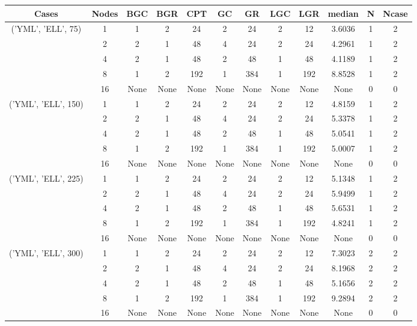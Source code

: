 \begin{tabular}{cccccccccccc}
\hline
Cases & Nodes& BGC& BGR& CPT& GC& GR& LGC& LGR& median & N & Ncase \\
\hline
\multirow{5}{*}{('YML', 'ELL', 75)}& 1& 1& 2& 24& 2& 24& 2& 12& 3.6036& 1& 2\\
& 2& 2& 1& 48& 4& 24& 2& 24& 4.2961& 1& 2\\
& 4& 2& 1& 48& 2& 48& 1& 48& 4.1189& 1& 2\\
& 8& 1& 2& 192& 1& 384& 1& 192& 8.8528& 1& 2\\
& 16& None& None& None& None& None& None& None& None& 0& 0\\
\hline
\multirow{5}{*}{('YML', 'ELL', 150)}& 1& 1& 2& 24& 2& 24& 2& 12& 4.8159& 1& 2\\
& 2& 2& 1& 48& 4& 24& 2& 24& 5.3378& 1& 2\\
& 4& 2& 1& 48& 2& 48& 1& 48& 5.0541& 1& 2\\
& 8& 1& 2& 192& 1& 384& 1& 192& 5.0007& 1& 2\\
& 16& None& None& None& None& None& None& None& None& 0& 0\\
\hline
\multirow{5}{*}{('YML', 'ELL', 225)}& 1& 1& 2& 24& 2& 24& 2& 12& 5.1348& 1& 2\\
& 2& 2& 1& 48& 4& 24& 2& 24& 5.9499& 1& 2\\
& 4& 2& 1& 48& 2& 48& 1& 48& 5.6531& 1& 2\\
& 8& 1& 2& 192& 1& 384& 1& 192& 4.8241& 1& 2\\
& 16& None& None& None& None& None& None& None& None& 0& 0\\
\hline
\multirow{5}{*}{('YML', 'ELL', 300)}& 1& 1& 2& 24& 2& 24& 2& 12& 7.3023& 2& 2\\
& 2& 2& 1& 48& 4& 24& 2& 24& 8.1968& 2& 2\\
& 4& 2& 1& 48& 2& 48& 1& 48& 5.1656& 2& 2\\
& 8& 1& 2& 192& 1& 384& 1& 192& 9.2894& 2& 2\\
& 16& None& None& None& None& None& None& None& None& 0& 0\\
\hline
\end{tabular}



